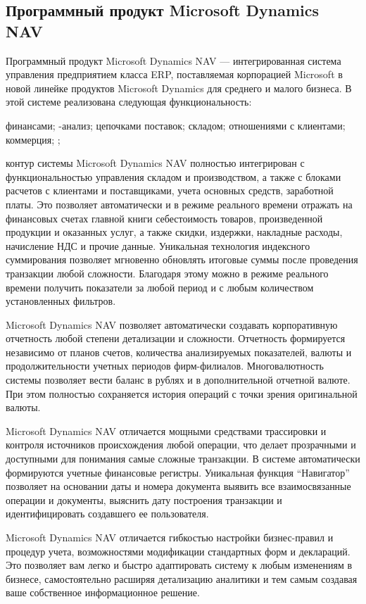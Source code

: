 \documentclass[14pt,a4paper]{reportmod}
\begin{document}
\subsection{Программный продукт Microsoft Dynamics NAV}
Программный продукт Microsoft Dynamics NAV — интегрированная система управления предприятием  класса ERP, поставляемая корпорацией Microsoft в новой линейке продуктов Microsoft Dynamics для среднего и малого бизнеса. В этой системе реализована следующая функциональность:
\begin{itemize}
   финансами;
  -анализ;
   цепочками поставок;
   складом;
   отношениями с клиентами;
   коммерция;
  ;
\end{itemize}
 контур системы Microsoft Dynamics NAV полностью интегрирован с функциональностью управления складом и производством, а также с блоками расчетов с клиентами и поставщиками, учета основных средств, заработной платы. Это позволяет автоматически и в режиме реального времени отражать на финансовых счетах главной книги себестоимость товаров, произведенной продукции и оказанных услуг, а также скидки, издержки, накладные расходы, начисление НДС и прочие данные. Уникальная технология индексного суммирования позволяет мгновенно обновлять итоговые суммы после проведения транзакции любой сложности. Благодаря этому можно в режиме реального времени получить показатели за любой период и с любым количеством установленных фильтров.
\par Microsoft Dynamics NAV позволяет автоматически создавать корпоративную отчетность любой степени детализации и сложности. Отчетность формируется независимо от планов счетов, количества анализируемых показателей, валюты и продолжительности учетных периодов фирм-филиалов. Многовалютность системы позволяет вести баланс в рублях и в дополнительной отчетной валюте. При этом полностью сохраняется история операций с точки зрения оригинальной валюты.
\par Microsoft Dynamics NAV отличается мощными средствами трассировки и контроля источников происхождения любой операции, что делает прозрачными и доступными для понимания самые сложные транзакции. В системе автоматически формируются учетные финансовые регистры. Уникальная функция ``Навигатор'' позволяет на основании даты и номера документа выявить все взаимосвязанные операции и документы, выяснить дату построения транзакции и идентифицировать создавшего ее пользователя.
\par Microsoft Dynamics NAV отличается гибкостью настройки бизнес-правил и процедур учета, возможностями модификации стандартных форм и деклараций. Это позволяет вам легко и быстро адаптировать систему к любым изменениям в бизнесе, самостоятельно расширяя детализацию аналитики и тем самым создавая ваше собственное информационное решение.
\end{document}
